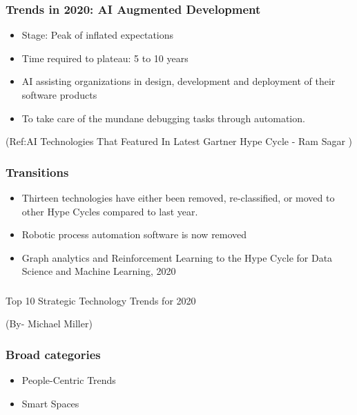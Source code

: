 \begin{frame}[fragile]\frametitle{Trends in 2020: AI Augmented Development}
\begin{itemize}
\item Stage: Peak of inflated expectations
\item Time required to plateau: 5 to 10 years
\item AI assisting organizations in design, development and deployment of their software products
\item To take care of the mundane debugging tasks through automation.
\end{itemize}


{\tiny (Ref:AI Technologies That Featured In Latest Gartner Hype Cycle - 
Ram Sagar )}

\end{frame}



\begin{frame}[fragile]\frametitle{Transitions}

\begin{itemize}
\item Thirteen technologies have either been removed, re-classified, or moved to other Hype Cycles compared to last year.
\item Robotic process automation software is now removed 
\item Graph analytics and Reinforcement Learning to the Hype Cycle for Data Science and Machine Learning, 2020
\end{itemize}



\end{frame}

\begin{frame}[fragile]\frametitle{}
\begin{center}
{\Large Top 10 Strategic Technology Trends for 2020}
\end{center}

{\tiny (By- Michael Miller)}

\end{frame}


\begin{frame}[fragile]\frametitle{Broad categories}

\begin{itemize}
\item People-Centric Trends
\item Smart Spaces
\end{itemize}
\end{frame}

